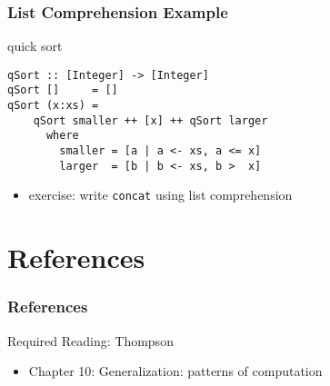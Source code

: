 \documentclass[dvipsnames]{beamer}
\theoremstyle{plain}
\begin{document}
\begin{frame}[fragile]
  \frametitle{List Comprehension Example}

  \begin{exampleblock}{quick sort}
    \begin{lstlisting}
qSort :: [Integer] -> [Integer]
qSort []     = []
qSort (x:xs) =
    qSort smaller ++ [x] ++ qSort larger
      where
        smaller = [a | a <- xs, a <= x]
        larger  = [b | b <- xs, b >  x]
    \end{lstlisting}
  \end{exampleblock}

  \pause
  \begin{itemize}
    \item exercise: write \lstinline|concat| using list comprehension
  \end{itemize}
\end{frame}

\section*{References}

\begin{frame}
  \frametitle{References}

  \begin{block}{Required Reading: Thompson}
    \begin{itemize}
      \item Chapter 10: \alert{Generalization: patterns of computation}
    \end{itemize}
  \end{block}
\end{frame}
\end{document}
